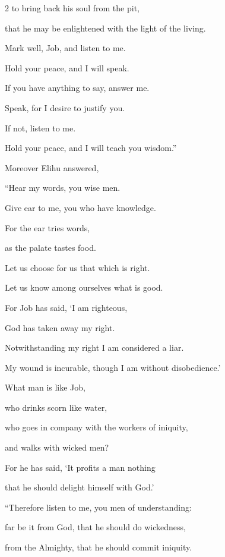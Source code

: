 \begin{multicols}{2}
	\myverse{}to bring back his soul from the pit,
	
	that he may be enlightened with the light of the living.
	
	\myverse{}Mark well, Job, and listen to me.
	
	Hold your peace, and I will speak.
	
	\myverse{}If you have anything to say, answer me.
	
	Speak, for I desire to justify you.
	
	\myverse{}If not, listen to me.
	
	Hold your peace, and I will teach you wisdom.”
	
	
	
	\mychapter{} \myverse*{}Moreover Elihu answered,
	
\quad\quad	\myverse{}“Hear my words, you wise men.
	
	Give ear to me, you who have knowledge.
	
	\myverse{}For the ear tries words,
	
	as the palate tastes food.
	
	\myverse{}Let us choose for us that which is right.
	
	Let us know among ourselves what is good.
	
	\myverse{}For Job has said, ‘I am righteous,
	
	God has taken away my right.
	
	\myverse{}Notwithstanding my right I am considered a liar.
	
	My wound is incurable, though I am without disobedience.’
	
	\myverse{}What man is like Job,
	
	who drinks scorn like water,
	
	\myverse{}who goes in company with the workers of iniquity,
	
	and walks with wicked men?
	
	\myverse{}For he has said, ‘It profits a man nothing
	
	that he should delight himself with God.’
	
		\vspace{\baselineskip}
	
	
	\myverse{}“Therefore listen to me, you men of understanding:
	
	far be it from God, that he should do wickedness,
	
	from the Almighty, that he should commit iniquity.
	

\end{multicols}
